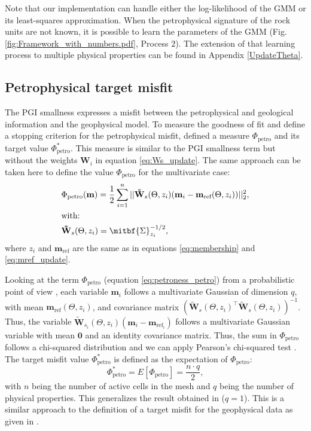 \documentclass[extra, mreferee]{gji_joint} %
\begin{document}
Note that our implementation can handle either the log-likelihood of the GMM or its least-squares approximation. When the petrophysical signature of the rock units are not known, it is possible to learn the parameters of the GMM \citep{ggz389} (Fig. \ref{fig:Framework_with_numbers.pdf}, Process $2$). The extension of that learning process to multiple physical properties can be found in Appendix \ref{UpdateTheta}.

\subsection{Petrophysical target misfit} \label{sec:target}

The PGI smallness expresses a misfit between the petrophysical and geological information and the geophysical model. To measure the goodness of fit and define a stopping criterion for the petrophysical misfit, \citet{ggz389} defined a measure $\Phi_{\text{petro}}$ and its target value $\Phi_{\text{petro}}^*$. This measure is similar to the PGI smallness term but without the weights $\mathbf{W}_i$ in equation \eqref{eq:Ws_update}. The same approach can be taken here to define the value $\Phi_{\text{petro}}$ for the multivariate case:
\begin{align}
&\Phi_{\text{petro}}(\mathbf{m}) = \frac{1}{2}\sum_{i=1}^n||\mathbf{\tilde{W}}_{s}(\Theta, z_i)(\mathbf{m}_i-\mathbf{m}_{\text{ref}}(\Theta, z_i))||_2^2 \label{eq:petroness_petro},\\
&\text{with: } \nonumber \\
&\mathbf{\tilde{W}}_{s}(\Theta, z_i) = \mitbf{\Sigma}_{z_i}^{-1/2},
\end{align}
where $z_i$ and $\mathbf{m}_{\text{ref}}$ are the same as in equations \eqref{eq:membership} and \eqref{eq:mref_update}.

Looking at the term $\Phi_{\text{petro}}$ (equation \eqref{eq:petroness_petro}) from a probabilistic point of view \citep{Tarantola,ggz389}, each variable $\mathbf{m}_i$ follows a multivariate Gaussian of dimension $q$, with mean $\mathbf{m}_{\text{ref}}(\Theta, z_i)$, and covariance matrix $\left(\mathbf{\tilde{W}}_{s}(\Theta, z_i)^\top \mathbf{\tilde{W}}_{s}(\Theta, z_i)\right)^{-1}$. Thus, the variable $\mathbf{\tilde{W}}_{s_i}(\Theta, z_i)(\mathbf{m}_i-\mathbf{m}_{\text{ref}_i})$ follows a multivariate Gaussian variable with mean $\mathbf{0}$ and an identity covariance matrix. Thus, the sum in $\Phi_{\text{petro}}$ follows a chi-squared distribution and we can apply Pearson's chi-squared test \citep{Pearson1900}. The target misfit value $\Phi_{\text{petro}}^*$ is defined as the expectation of $\Phi_{\text{petro}}$:
\begin{equation}
 \Phi_{\text{petro}}^* = E[\Phi_{\text{petro}}] = \frac{n\cdot q}{2} \label{eq:petrotarget},
\end{equation}
with $n$ being the number of active cells in the mesh and $q$ being the number of physical properties. This generalizes the result obtained in \citet{ggz389} ($q=1$). This is a similar approach to the definition of a target misfit for the geophysical data as given in \citet{Parker}.
\end{document}
